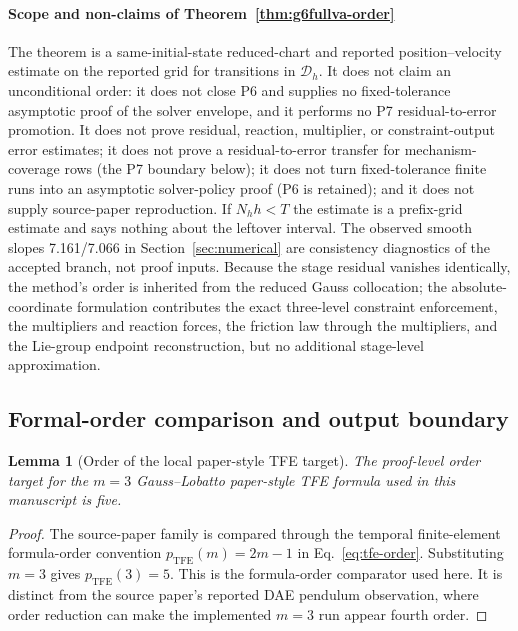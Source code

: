 \documentclass[preprint,12pt]{elsarticle}
\newtheorem{lemma}{Lemma}
\newcommand{\tfe}{TFE}
\begin{document}
\paragraph{Scope and non-claims of Theorem~\ref{thm:g6fullva-order}}
The theorem is a same-initial-state reduced-chart and reported
position--velocity estimate on the reported grid for transitions in
$\mathcal D_h$. It does not claim an unconditional order: it does not close
P6 and supplies no fixed-tolerance asymptotic proof of the solver envelope,
and it performs no P7 residual-to-error promotion. It does not prove
residual, reaction, multiplier, or constraint-output error estimates; it does
not prove a residual-to-error transfer for mechanism-coverage rows (the P7
boundary below); it does not turn fixed-tolerance finite runs into an
asymptotic solver-policy proof (P6 is retained); and it does not supply
source-paper reproduction. If
$N_hh<T$ the estimate is a prefix-grid estimate and says nothing about the
leftover interval. The observed smooth slopes 7.161/7.066 in
Section~\ref{sec:numerical} are consistency diagnostics of the accepted
branch, not proof inputs. Because the stage residual vanishes identically,
the method's order is inherited from the reduced Gauss collocation; the
absolute-coordinate formulation contributes the exact three-level constraint
enforcement, the multipliers and reaction forces, the friction law through
the multipliers, and the Lie-group endpoint reconstruction, but no additional
stage-level approximation.

\subsection{Formal-order comparison and output boundary}

\begin{lemma}[Order of the local paper-style \tfe{} target]
\label{lem:tfe-target-order}
The proof-level order target for the $m=3$ Gauss--Lobatto paper-style
\tfe{} formula used in this manuscript is five.
\end{lemma}

\begin{proof}
The source-paper family is compared through the temporal finite-element
formula-order convention
$p_{\mathrm{TFE}}(m)=2m-1$ in Eq.~\eqref{eq:tfe-order}. Substituting
$m=3$ gives $p_{\mathrm{TFE}}(3)=5$. This is the formula-order comparator
used here. It is distinct from the source paper's reported DAE pendulum
observation, where order reduction can make the implemented $m=3$ run appear
fourth order.
\end{proof}
\end{document}
